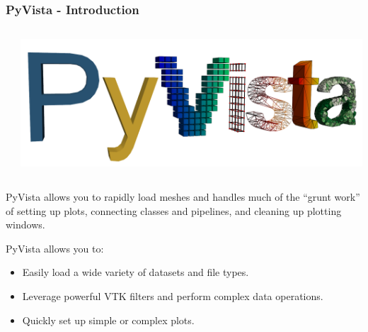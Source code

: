 \documentclass[t]{beamer}
\begin{document}
\begin{frame}
  \frametitle{PyVista - Introduction}

  \begin{columns}[T]

    \begin{column}{.5\textwidth}
      \vspace{-10pt}
      \inputminted[fontsize=\footnotesize]{python}{code/pv_example1.py}
    \end{column}

    \begin{column}{.4\textwidth}
      \vspace{-20pt}
      \centering
      \includegraphics[height=0.2\textheight]{figures/pyvista_logo.png}
    \end{column}

  \end{columns}
  \vspace{5pt}

  PyVista allows you to rapidly load meshes and handles much of the “grunt
  work” of setting up plots, connecting classes and pipelines, and cleaning up
  plotting windows.

  \vspace{5pt}

  \begin{exampleblock}{PyVista allows you to:}
    \begin{itemize}
    \item Easily load a wide variety of datasets and file types.
    \item Leverage powerful VTK filters and perform complex data operations.
    \item Quickly set up simple or complex plots.
    \end{itemize}
  \end{exampleblock}

\end{frame}
\end{document}
